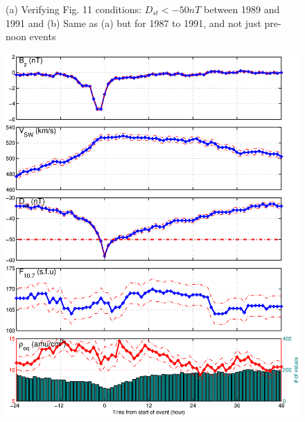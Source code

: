\documentclass[10pt,twocolumn]{article}
\begin{document}
\begin{figure}[htp!]
\caption{(a) Verifying \cite{Takahashi2010} Fig. 11 conditions: $D_{st}<-50nT$ between 1989 and 1991 and (b) Same as (a) but for 1987 to 1991, and not just pre-noon events}
\label{DailyAverages}
\end{figure}

\begin{figure}[htp!]
\centering
\includegraphics[scale=0.45]{paperfigures/stormavs-dst.eps}

\end{figure}
\end{document}
